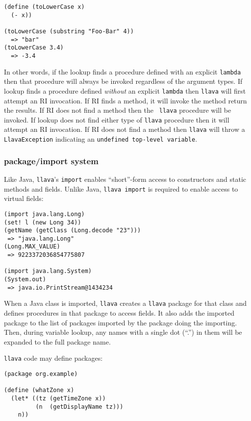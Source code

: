 \documentclass{acm-final/sig-alternate-modified}
\begin{document}
\small
\begin{verbatim}
(define (toLowerCase x)
  (- x))

(toLowerCase (substring "Foo-Bar" 4))
  => "bar"
(toLowerCase 3.4)
  => -3.4
\end{verbatim}
\normalsize

In other words, if the lookup finds a procedure defined with an
explicit {\tt lambda} then that procedure will always be invoked
regardless of the argument types.  If lookup finds a procedure defined
\emph{without} an explicit {\tt lambda} then {\tt llava} will first
attempt an RI invocation.  If RI finds a method, it will invoke the
method return the results.  If RI does not find a method then the {\tt
llava} procedure will be invoked.  If lookup does not find either type
of {\tt llava} procedure then it will attempt an RI invocation.  If RI
does not find a method then {\tt llava} will throw a {\tt
LlavaException} indicating an {\tt undefined top-level variable}.

\subsubsection{package/import system}

Like Java, {\tt llava}'s {\tt import} enables ``short''-form access to
constructors and static methods and fields.  Unlike Java, {\tt llava
import} is required to enable access to virtual fields:

\small
\begin{verbatim}
(import java.lang.Long)
(set! l (new Long 34))
(getName (getClass (Long.decode "23")))
 => "java.lang.Long"
(Long.MAX_VALUE)
 => 9223372036854775807

(import java.lang.System)
(System.out)
 => java.io.PrintStream@1434234
\end{verbatim}
\normalsize

When a Java class is imported, {\tt llava} creates a {\tt llava}
package for that class and defines procedures in that package to
access fields.  It also adds the imported package to the list of
packages imported by the package doing the importing.  Then, during
variable lookup, any names with a single dot (``.'') in them will be
expanded to the full package name.


{\tt llava} code may define packages:

\small
\begin{verbatim}
(package org.example)

(define (whatZone x)
  (let* ((tz (getTimeZone x))
         (n  (getDisplayName tz)))
    n))
\end{verbatim}
\normalsize
\end{document}
